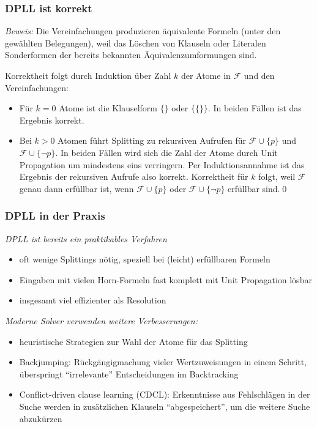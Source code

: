 \documentclass[aspectratio=1610,onlymath]{beamer}
\begin{document}
\begin{frame}\frametitle{DPLL ist korrekt}

\pause

\emph{Beweis:}
Die Vereinfachungen produzieren äquivalente Formeln (unter den gewählten Belegungen), weil das Löschen von Klauseln oder Literalen
Sonderformen der bereits bekannten Äquivalenzumformungen sind.
\medskip\pause

Korrektheit folgt durch Induktion über Zahl $k$ der Atome in $\mathcal{F}$ und den Vereinfachungen\pause:
\begin{itemize}
	\item Für $k=0$ Atome ist die Klauselform $\{\}$ oder $\{\{\}\}$. In beiden Fällen ist das Ergebnis korrekt.\pause
	\item Bei $k>0$ Atomen führt Splitting zu rekursiven Aufrufen für $\mathcal{F}\cup\{p\}$ und $\mathcal{F}\cup\{\neg p\}$.\pause
	In beiden Fällen wird sich die Zahl der Atome durch Unit Propagation um mindestens eins verringern.\pause
	Per Induktionsannahme ist das Ergebnis der rekursiven Aufrufe also korrekt. \pause
	Korrektheit für $k$ folgt, weil $\mathcal{F}$ genau dann erfüllbar ist, wenn $\mathcal{F}\cup\{p\}$ oder $\mathcal{F}\cup\{\neg p\}$
	erfüllbar sind.\qed
\end{itemize}

\end{frame}


\begin{frame}\frametitle{DPLL in der Praxis}

\emph{DPLL ist bereits ein praktikables Verfahren}
\begin{itemize}
\item oft wenige Splittings nötig, speziell bei (leicht) erfüllbaren Formeln
\item Eingaben mit vielen Horn-Formeln fast komplett mit Unit Propagation lösbar
\item insgesamt viel effizienter als Resolution
\end{itemize}
\medskip\pause

\emph{Moderne Solver verwenden weitere Verbesserungen:}
\begin{itemize}
\item heuristische \alert{Strategien zur Wahl der Atome} für das Splitting
\item \alert{Backjumping:} Rückgängigmachung vieler Wertzuweisungen in einem Schritt, überspringt "`irrelevante"' Entscheidungen im Backtracking
\item \alert{Conflict-driven clause learning (CDCL):} Erkenntnisse aus Fehlschlägen in der Suche werden in zusätzlichen Klauseln "`abgespeichert"', um die weitere Suche abzukürzen
\end{itemize}

\end{frame}
\end{document}
